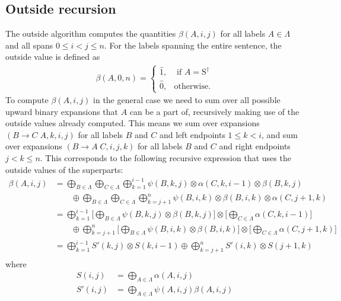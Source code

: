 \subsection{Outside recursion}
  The outside algorithm computes the quantities $\beta(A,i,j)$ for all labels $A \in \Lambda$ and all spans $0 \leq i < j \leq n$. For the labels spanning the entire sentence, the outside value is defined as
  \begin{align*}
    \beta(A, 0, n) =
    \begin{cases}
      \hat{1}, & \text{ if } A = \text{S}^{\dagger}  \\
      \hat{0}, & \text{otherwise}.
    \end{cases}
  \end{align*}
  To compute $\beta(A, i, j)$ in the general case we need to sum over all possible upward binary expansions that $A$ can be a part of, recursively making use of the outside values already computed. This means we sum over expansions $(B \to C \; A, k, i, j)$ for all labels $B$ and $C$ and left endpoints $1 \leq k < i$, and sum over expansions $(B \to A \; C, i, j, k)$ for all labels $B$ and $C$ and right endpoints $j < k \leq n$. This corresponds to the following recursive expression that uses the outside values of the superparts:
  \begin{align*}
    \beta(A, i, j)
      &= \bigoplus_{B \in \Lambda} \bigoplus_{C \in \Lambda} \bigoplus_{k=1}^{i-1} \psi(B, k, j) \otimes \alpha(C, k, i-1) \otimes \beta(B, k, j) \\
        &\qquad \oplus \bigoplus_{B \in \Lambda} \bigoplus_{C \in \Lambda} \bigoplus_{k=j+1}^{n} \psi(B, i, k) \otimes \beta(B, i, k) \otimes \alpha(C, j+1, k) \\
      &=  \bigoplus_{k=1}^{i-1}  \Bigg[ \bigoplus_{B \in \Lambda} \psi(B, k, j)  \otimes \beta(B, k, j) \Bigg] \otimes \Bigg[ \bigoplus_{C \in \Lambda} \alpha(C, k, i-1) \Bigg] \\
        &\qquad \oplus \bigoplus_{k=j+1}^{n}  \Bigg[ \bigoplus_{B \in \Lambda}  \psi(B, i, k) \otimes \beta(B, i, k) \Bigg] \otimes  \Bigg[  \bigoplus_{C \in \Lambda} \alpha(C, j+1, k) \Bigg] \\
      &=  \bigoplus_{k=1}^{i-1}  S'(k, j) \otimes S(k, i-1) \oplus \bigoplus_{k=j+1}^{n} S'(i, k) \otimes  S(j+1, k) \\
  \end{align*}
  where
  \begin{align*}
      S(i, j) &= \bigoplus_{A \in \Lambda} \alpha(A, i, j) \\
      S'(i, j) &= \bigoplus_{A \in \Lambda} \psi(A, i, j) \beta(A, i, j)
  \end{align*}

